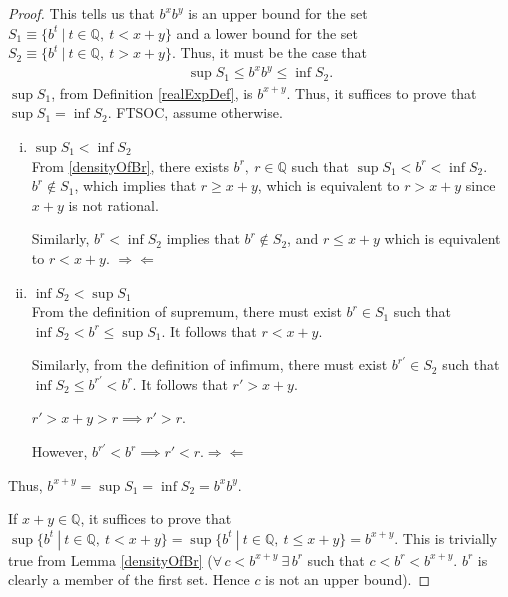 \documentclass[12pt]{article}
\begin{document}
\begin {enumerate} [(a)]
\begin{proof}
      This tells us that $b^xb^y$ is an upper bound for the set
      $S_1 \equiv \{b^t \ | \ t \in \mathbb{Q}, \ t < x + y\}$ and a lower bound for the set
      $S_2 \equiv \{b^t \ | \ t \in \mathbb{Q}, \ t > x + y\}$. Thus, it must be the case that
      \begin{align*}
            \sup{S_1} \le b^xb^y \le \inf{S_2}.
      \end{align*}
      $\sup{S_1}$, from Definition \ref{realExpDef}, is $b^{x+y}$. Thus, it suffices to
      prove that $\sup{S_1} = \inf{S_2}$. FTSOC, assume otherwise.
      \begin{enumerate}[(i)]
            \item
                  $\sup{S_1} < \inf{S_2}$\\
                  From \ref{densityOfBr}, there exists $b^r,\ r\in \mathbb{Q}$ such that
                  $\sup{S_1} < b^r < \inf{S_2}$. $b^r \notin S_1$, which implies that
                  $r \ge x+y$, which is equivalent to $r > x+y$ since $x+y$ is not rational.

                  Similarly, $b^r < \inf{S_2}$ implies that $b^r \notin S_2$, and $r \le x+y$
                  which is equivalent to $r < x+y$. \hfill  $\Rightarrow\Leftarrow$
            \item
                  $ \inf{S_2}< \sup{S_1}$\\
                  From the definition of supremum, there must exist $b^r \in S_1$
                  such that $ \inf{S_2}< b^r \le \sup{S_1}$. It follows that
                  $r < x+y$.

                  Similarly, from the definition of infimum, there must exist $b^{r'} \in S_2$
                  such that $\inf{S_2} \le b^{r'} < b^r$. It follows that $r' > x+y$.

                  $r' > x+y > r
                        \implies  r' > r$.

                  However, $b^{r'} < b^r \implies r' < r$.\hfill  $\Rightarrow\Leftarrow$
      \end{enumerate}
      Thus, $b^{x+y} = \sup{S_1} = \inf{S_2} = b^xb^y$.

      If $x+y \in \mathbb{Q}$, it suffices to prove that
      $\sup\{b^t \ | \ t \in \mathbb{Q}, \ t < x + y\} = \sup\{b^t \ | \ t \in \mathbb{Q}, \ t \le x + y\}
            = b^{x+y}$. This is trivially true from Lemma \ref{densityOfBr}
      ($\forall \,c < b^{x+y} \ \exists \,b^r$ such that $c < b^r <b^{x+y}$. $b^r$ is
      clearly a member of the first set. Hence $c$ is not an upper bound).
\end{proof}
\end {enumerate}
\end{document}
